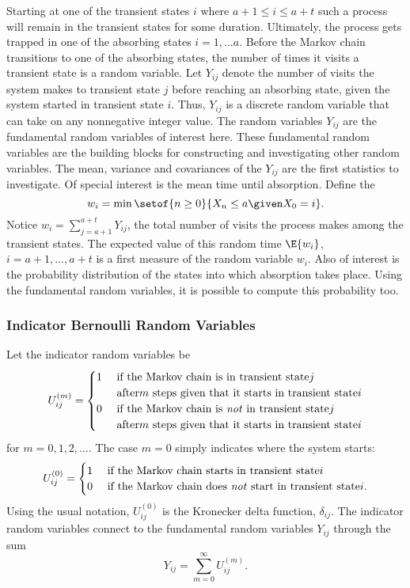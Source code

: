 \documentclass[12pt]{article}
\begin{document}
Starting at one of the transient states \( i \) where \( a+1 \le i \le
a+t \) such a process will remain in the transient states for some
duration.  Ultimately, the process gets trapped in one of the absorbing
states \( i = 1, \dots a \).  Before the Markov chain transitions to one
of the absorbing states, the number of times it visits a transient state
is a random variable.  Let \( Y_{ij} \) denote the number of visits the
system makes to transient state \( j \) before reaching an absorbing
state, given the system started in transient state \( i \).  Thus, \( Y_
{ij} \) is a discrete random variable that can take on any nonnegative
integer value.  The random variables \( Y_{ij} \) are the fundamental
random variables of interest here.  These fundamental random variables
are the building blocks for constructing and investigating other random
variables.  The mean, variance and covariances of the \( Y_{ij} \) are
the first statistics to investigate.  Of special interest is the mean
time until absorption.%
Define the %
\[
    w_i = \min \setof{n \ge 0}{X_n \le a \given X_0 = i}.
\] Notice \( w_i = \sum_ {j=a+1}^{a+t} Y_{ij} \), the total number of
visits the process makes among the transient states.  The expected value
of this random time \( \E{w_i} \), \( i = a+1, \dots, a+t \) is a first
measure of the random variable \( w_i \).  Also of interest is the
probability distribution of the states into which absorption takes
place.  Using the fundamental random variables, it is possible to
compute this probability too.

\subsubsection*{Indicator Bernoulli Random Variables}

Let the indicator random variables be
\[
    U_{ij}^{(m)} =
    \begin{cases}
        1 & \text{ if the Markov chain is in transient state} j \\
        & \text{ after} m \text{ steps given that it starts in transient
        state} i \\
        0 & \text{ if the Markov chain is \emph{not} in transient state}
        j \\
        & \text{ after} m \text{ steps given that it starts in transient
        state} i
    \end{cases}
\] for \( m = 0, 1,2, \dots \).  The case \( m = 0 \) simply indicates
where the system starts:
\[
    U_{ij}^{(0)} =
    \begin{cases}
        1 & \text{ if the Markov chain starts in transient state} i \\
        0 & \text{ if the Markov chain does \emph{not} start in transient
        state} i.
    \end{cases}
\] Using the usual notation, \( U_{ij}^{(0)} \) is the Kronecker delta
function, \( \delta_{ij} \).  The indicator random variables connect to
the fundamental random variables \( Y_{ij} \) through the sum
\[
    Y_{ij} = \sum\limits_{m=0}^{\infty} U_{ij}^{(m)}.
\]
\end{document}
